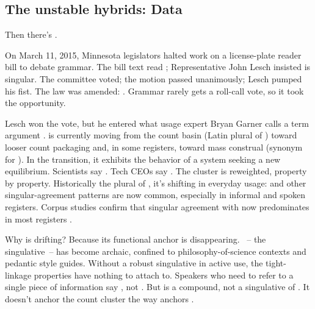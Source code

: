 \subsection{The unstable hybrids: Data}
\label{sec:9:data}

Then there's .

On March 11, 2015, Minnesota legislators halted work on a license-plate reader bill to debate grammar. The bill text read ; Representative John Lesch insisted  is singular. The committee voted; the motion passed unanimously; Lesch pumped his fist. The law was amended: . Grammar rarely gets a roll-call vote, so it took the opportunity.

Lesch won the vote, but he entered what usage expert Bryan Garner calls a  term argument \citep{garner2016}.  is currently moving from the count basin (Latin plural of ) toward looser count packaging and, in some registers, toward mass construal (synonym for ). In the transition, it exhibits the behavior of a system seeking a new equilibrium. Scientists say . Tech CEOs say . The cluster is reweighted, property by property. Historically the plural of , it's shifting in everyday usage:  and other singular-agreement patterns are now common, especially in informal and spoken registers. Corpus studies confirm that singular agreement with  now predominates in most registers \citep{garner2016}.

Why is  drifting? Because its functional anchor is disappearing. ~-- the singulative~-- has become archaic, confined to philosophy-of-science contexts and pedantic style guides. Without a robust singulative in active use, the tight-linkage properties have nothing to attach to. Speakers who need to refer to a single piece of information say , not . But  is a compound, not a singulative of . It doesn't anchor the count cluster the way  anchors .

